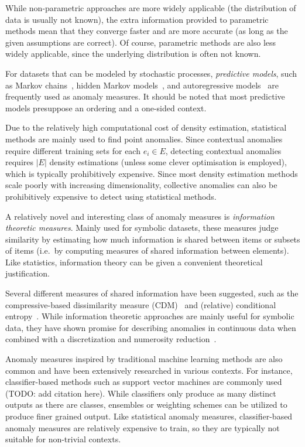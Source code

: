 While non-parametric approaches are more widely applicable (the distribution of data is usually not known), the extra information provided to parametric methods mean that they converge faster and are more accurate (as long as the given assumptions are correct). Of course, parametric methods are also less widely applicable, since the underlying distribution is often not known.

For datasets that can be modeled by stochastic processes, \emph{predictive models}, such as Markov chains~\cite{TODO}, hidden Markov models~\cite{TODO}, and autoregressive models~\cite{TODO} are frequently used as anomaly measures. It should be noted that most predictive models presuppose an ordering and a one-sided context.

Due to the relatively high computational cost of density estimation, statistical methods are mainly used to find point anomalies. Since contextual anomalies require different training sets for each $e_i \in E$, detecting contextual anomalies requires $|E|$ density estimations (unless some clever optimisation is employed), which is typically prohibitively expensive. Since most density estimation methods scale poorly with increasing dimensionality, collective anomalies can also be prohibitively expensive to detect using statistical methods.

A relatively novel and interesting class of anomaly measures is \emph{information theoretic measures}. Mainly used for symbolic datasets, these measures judge similarity by estimating how much information is shared between items or subsets of items (i.e.\ by computing measures of shared information between elements). Like statistics, information theory can be given a convenient theoretical justification.

Several different measures of shared information have been suggested, such as the compressive-based dissimilarity measure (CDM)~\cite{keogh2} and (relative) conditional entropy~\cite{xiang}. While information theoretic approaches are mainly useful for symbolic data, they have shown promise for describing anomalies in continuous data when combined with a discretization and numerosity reduction~\cite{keogh2}.

Anomaly measures inspired by traditional machine learning methods are also common and have been extensively researched in various contexts. For instance, classifier-based methods such as support vector machines are commonly used (TODO: add citation here). While classifiers only produce as many distinct outputs as there are classes, ensembles or weighting schemes can be utilized to produce finer grained output. Like statistical anomaly measures, classifier-based anomaly measures are relatively expensive to train, so they are typically not suitable for non-trivial contexts.

